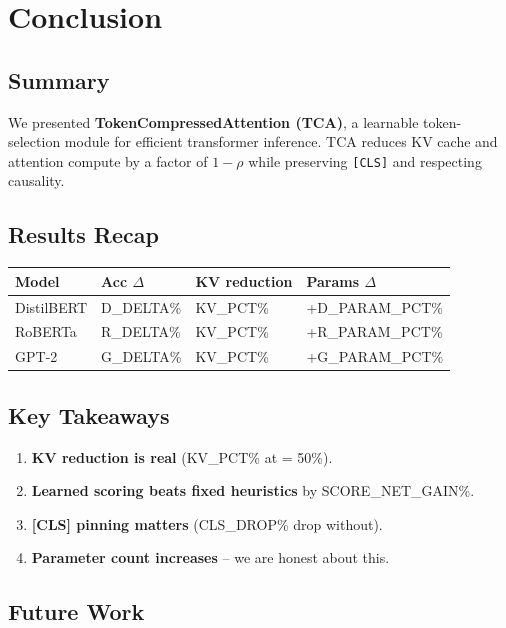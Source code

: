 \section{Conclusion}

\subsection{Summary}

We presented \textbf{TokenCompressedAttention (TCA)}, a learnable token-selection 
module for efficient transformer inference. TCA reduces KV cache and 
attention compute by a factor of $1 - \rho$ while preserving \texttt{[CLS]} and 
respecting causality.

\subsection{Results Recap}

\begin{table}[H]
\centering
\small
\begin{tabular}{llll}
\toprule
\textbf{Model} & \textbf{Acc $\Delta$} & \textbf{KV reduction} & \textbf{Params $\Delta$} \\
\midrule
DistilBERT & {{D\_DELTA}}\% & {{KV\_PCT}}\% & +{{D\_PARAM\_PCT}}\% \\
RoBERTa & {{R\_DELTA}}\% & {{KV\_PCT}}\% & +{{R\_PARAM\_PCT}}\% \\
GPT-2 & {{G\_DELTA}}\% & {{KV\_PCT}}\% & +{{G\_PARAM\_PCT}}\% \\
\bottomrule
\end{tabular}
\end{table}

\subsection{Key Takeaways}

\begin{enumerate}
\item \textbf{KV reduction is real} ({{KV\_PCT}}\% at   = 50\%).
\item \textbf{Learned scoring beats fixed heuristics} by {{SCORE\_NET\_GAIN}}\%.
\item \textbf{[CLS] pinning matters} ({{CLS\_DROP}}\% drop without).
\item \textbf{Parameter count increases} -- we are honest about this.

\end{enumerate}
\subsection{Future Work}

